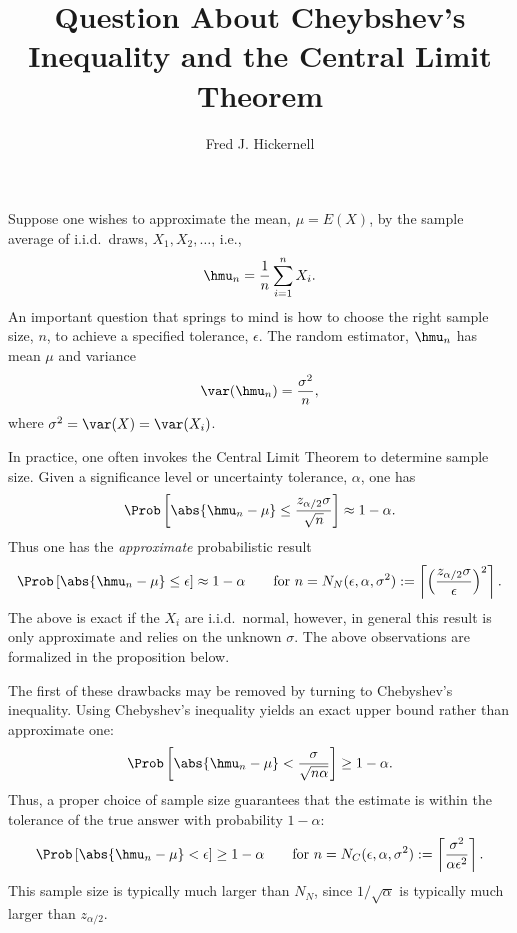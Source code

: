 \documentclass[12pt]{amsart}
\begin{document}
\title{Question About Cheybshev's Inequality and the Central Limit Theorem}
\author{Fred J. Hickernell}
\maketitle

Suppose one wishes to approximate the mean, $\mu=E(X)$, by the sample average of i.i.d.\ draws, $X_1, X_2, \ldots$, i.e., 
\begin{equation} \label{simpleMCest}
\hmu_n = \frac 1n \sum_{i=1}^n X_i.
\end{equation}
An important question that springs to mind is how to choose the right sample size, $n$, to achieve a specified tolerance, $\epsilon$.  The random estimator, $\hmu_n$ has mean $\mu$ and variance
\begin{equation*}
\var(\hmu_n) = \frac{\sigma^2}{n},
\end{equation*}
where $\sigma^2=\var(X)=\var(X_i)$.

In practice, one often invokes the Central Limit Theorem to determine sample size. Given a significance level or uncertainty tolerance, $\alpha$, one has 
\[
\Prob\left[\abs{\hmu_n-\mu} \le \frac{z_{\alpha/2} \sigma}{\sqrt{n}} \right] \approx 1-\alpha.
\]
Thus one has the \emph{approximate} probabilistic result
\begin{equation} \label{CLTerr}
\Prob\left[\abs{\hmu_n-\mu} \le \epsilon \right] \approx 1-\alpha \qquad \text{for } n=N_{N}(\epsilon,\alpha,\sigma^2) :=\left \lceil \left(\frac{z_{\alpha/2}\sigma}{\epsilon}\right)^2 \right \rceil.
\end{equation}
The above is exact if the $X_i$ are i.i.d.\ normal, however, in general this result is only approximate and relies on the unknown $\sigma$.  The above observations are formalized in the proposition below.  

The first of these drawbacks may be removed by turning to Chebyshev's inequality.  Using Chebyshev's inequality yields an exact upper bound rather than approximate one:
\[
\Prob\left[\abs{\hmu_n-\mu} < \frac{\sigma}{\sqrt{n \alpha}} \right] \ge 1-\alpha.
\]
Thus, a proper choice of sample size guarantees that the estimate is within the tolerance of the true answer with probability $1-\alpha$:
\begin{equation} \label{Cheberr}
\Prob\left[\abs{\hmu_n-\mu} < \epsilon \right] \ge 1-\alpha \qquad \text{for } n= N_C(\epsilon,\alpha,\sigma^2):= \left \lceil \frac{\sigma^2}{\alpha\epsilon^2} \right \rceil.
\end{equation}
This sample size is typically much larger than $N_N$, since $1/\sqrt{\alpha}$ is typically much larger than $z_{\alpha/2}$.
\end{document}
